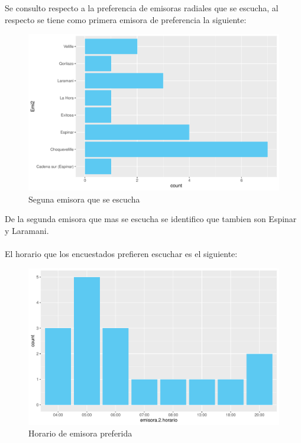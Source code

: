 \documentclass[12pt]{article}\usepackage[]{graphicx}\usepackage[]{xcolor}
\makeatletter
\def\maxwidth{ %
  \ifdim\Gin@nat@width>\linewidth
    \linewidth
  \else
    \Gin@nat@width
  \fi
}
\newenvironment{knitrout}{}{} %
\makeatother
\begin{document}
	Se consulto respecto a la preferencia de emisoras radiales que se escucha, al respecto se tiene como primera emisora de preferencia la siguiente:
	\begin{figure}[H]
	\centering
\begin{knitrout}
\color{fgcolor}
\includegraphics[width=\maxwidth]{figure/four-1} 
\end{knitrout}
	\caption{Seguna emisora que se escucha}
	\end{figure}
	De la segunda emisora que mas se escucha se identifico que tambien son Espinar y Laramani.\\
	\\
	El horario que los encuestados prefieren escuchar es el siguiente:
	\begin{figure}[H]
	\centering
\begin{knitrout}
\color{fgcolor}
\includegraphics[width=\maxwidth]{figure/five-1} 
\end{knitrout}
	\caption{Horario de emisora preferida}
	\end{figure}
	
\end{document}
